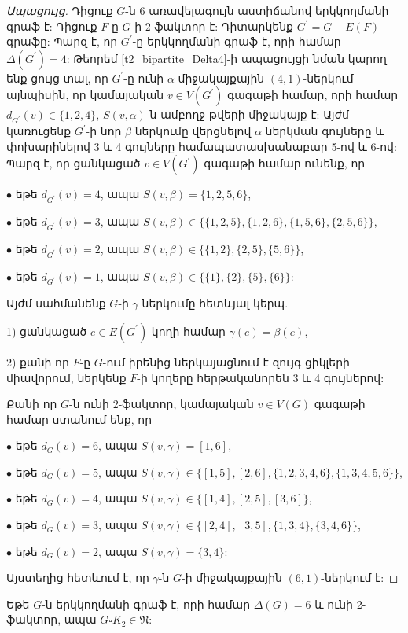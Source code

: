 \begin{proof}[Ապացույց]
Դիցուք $G$-ն 6 առավելագույն աստիճանով երկկողմանի գրաֆ է:
Դիցուք $F$-ը $G$-ի $2$-ֆակտոր է: Դիտարկենք $G^{\prime}=G-E(F)$ գրաֆը:
Պարզ է, որ $G^{\prime}$-ը երկկողմանի գրաֆ է, որի համար
$\Delta(G^{\prime})=4$: Թեորեմ \ref{t2_bipartite_Delta4}-ի ապացույցի նման կարող ենք ցույց տալ, որ $G^{\prime}$-ը ունի $\alpha$ միջակայքային
$(4,1)$-ներկում այնպիսին, որ կամայական $v\in V(G^{\prime})$ գագաթի համար, որի համար $d_{G^{\prime}}(v)\in \{1,2,4\}$, $S(v,\alpha)$-ն ամբողջ թվերի միջակայք է: Այժմ կառուցենք $G^{\prime}$-ի նոր $\beta$ ներկումը վերցնելով $\alpha$ ներկման գույները և փոխարինելով 3 և 4 գույները համապատասխանաբար 5-ով և 6-ով: Պարզ է, որ ցանկացած $v\in
V(G^{\prime})$ գագաթի համար ունենք, որ

$\bullet$ եթե $d_{G^{\prime}}(v)=4$, ապա $S(v,\beta)=
\{1,2,5,6\}$,

$\bullet$ եթե $d_{G^{\prime}}(v)=3$, ապա
$S(v,\beta)\in \{\{1,2,5\},\{1,2,6\},\{1,5,6\},\{2,5,6\}\}$,

$\bullet$ եթե $d_{G^{\prime}}(v)=2$, ապա $S(v,\beta)\in
\{\{1,2\},\{2,5\},\{5,6\}\}$,

$\bullet$ եթե $d_{G^{\prime}}(v)=1$, ապա $S(v,\beta)\in
\{\{1\},\{2\},\{5\},\{6\}\}$:

Այժմ սահմանենք $G$-ի $\gamma$ ներկումը հետևյալ կերպ.

1) ցանկացած $e\in E(G^{\prime})$ կողի համար $\gamma(e)=\beta(e)$,

2) քանի որ $F$-ը $G$-ում իրենից ներկայացնում է զույգ ցիկլերի միավորում, ներկենք $F$-ի կողերը հերթականորեն 3 և 4 գույներով:

Քանի որ $G$-ն ունի 2-ֆակտոր, կամայական $v\in V(G)$ գագաթի համար ստանում ենք, որ

$\bullet$ եթե $d_{G}(v)=6$, ապա $S(v,\gamma)=[1,6]$,

$\bullet$ եթե $d_{G}(v)=5$, ապա
$S(v,\gamma)\in \{[1,5],[2,6],\{1,2,3,4,6\},\{1,3,4,5,6\}\}$,

$\bullet$ եթե $d_{G}(v)=4$, ապա $S(v,\gamma)\in
\{[1,4],[2,5],[3,6]\}$,

$\bullet$ եթե $d_{G}(v)=3$, ապա
$S(v,\gamma)\in \{[2,4],[3,5],\{1,3,4\},\{3,4,6\}\}$,

$\bullet$ եթե $d_{G}(v)=2$, ապա $S(v,\gamma)=\{3,4\}$:

Այստեղից հետևում է, որ $\gamma$-ն $G$-ի միջակայքային $(6,1)$-ներկում է:
\end{proof}

\begin{corollary}
\label{c2_bipartite_Delta6_2factor} Եթե $G$-ն երկկողմանի գրաֆ է, որի համար $\Delta(G)=6$ և ունի 2-ֆակտոր, ապա $G \square K_2 \in \mathfrak{N}$:
\end{corollary}